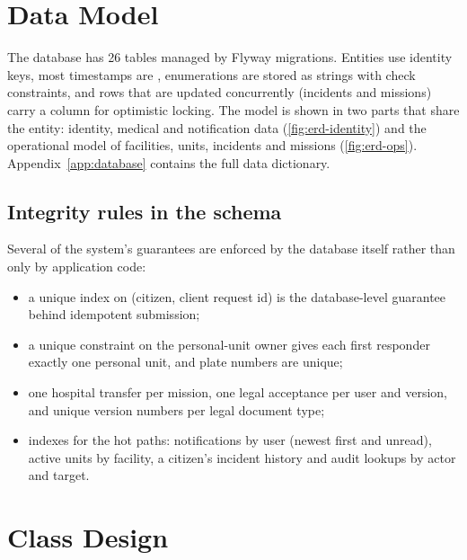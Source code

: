

\section{Data Model}\label{sec:persistence}

The database has 26 tables managed by Flyway migrations. Entities use  identity keys, most timestamps are
, enumerations are stored as strings with check constraints, and rows that are updated
concurrently (incidents and missions) carry a  column for optimistic locking. The model is shown in two
parts that share the  entity: identity, medical and notification data (\cref{fig:erd-identity}) and the
operational model of facilities, units, incidents and missions (\cref{fig:erd-ops}). Appendix~\ref{app:database} contains the
full data dictionary.


\subsection{Integrity rules in the schema}
Several of the system's guarantees are enforced by the database itself rather than only by application code:
\begin{itemize}
  \item a unique index on (citizen, client request id) is the database-level guarantee behind idempotent submission;
  \item a unique constraint on the personal-unit owner gives each first responder exactly one personal unit, and plate
        numbers are unique;
  \item one hospital transfer per mission, one legal acceptance per user and version, and unique version numbers per
        legal document type;
  \item indexes for the hot paths: notifications by user (newest first and unread), active units by facility, a citizen's
        incident history and audit lookups by actor and target.
\end{itemize}

\section{Class Design}


